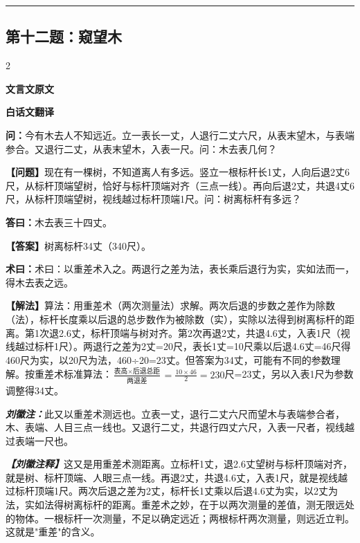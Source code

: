 \documentclass[10pt,a4paper]{article}
\newcommand{\wen}[1]{\textbf{\color{problemcolor}问：}#1\par}
\newcommand{\da}[1]{\textbf{答曰：}#1\par}
\newcommand{\shu}[1]{\textbf{术曰：}#1\par}
\newcommand{\liuhui}[1]{{\color{commentarycolor}\textit{\textbf{刘徽注：}}#1\par}}
\newcommand{\classicalheader}[1]{{\centering\large\bfseries\color{classicalcolor} #1\par\vspace{0.5em}}}
\newcommand{\wenmodern}[1]{\textbf{\color{moderncolor}【问题】}#1\par}
\newcommand{\damodern}[1]{\textbf{【答案】}#1\par}
\newcommand{\shumodern}[1]{\textbf{【解法】}#1\par}
\newcommand{\liuhuimodern}[1]{{\color{commentarycolor}\textit{\textbf{【刘徽注释】}}#1\par}}
\newcommand{\modernheader}[1]{{\centering\large\bfseries\color{moderncolor} #1\par\vspace{0.5em}}}
\newcommand{\problemsec}[1]{\subsection*{#1}}
\begin{document}
\vspace{0.3cm}
\hrule
\vspace{0.3cm}

\problemsec{第十二题：窥望木}
\begin{paracol}{2}
\classicalheader{文言文原文}
\switchcolumn
\modernheader{白话文翻译}
\switchcolumn*

\wen{今有木去人不知远近。立一表长一丈，人退行二丈六尺，从表末望木，与表端参合。又退行二丈，从表末望木，入表一尺。问：木去表几何？}

\switchcolumn

\wenmodern{现在有一棵树，不知道离人有多远。竖立一根标杆长1丈，人向后退2丈6尺，从标杆顶端望树，恰好与标杆顶端对齐（三点一线）。再向后退2丈，共退4丈6尺，从标杆顶端望树，视线越过标杆顶端1尺。问：树离标杆有多远？}

\switchcolumn*

\da{木去表三十四丈。}

\switchcolumn

\damodern{树离标杆34丈（340尺）。}

\switchcolumn*

\shu{术曰：以重差术入之。两退行之差为法，表长乘后退行为实，实如法而一，得木去表之远。}

\switchcolumn

\shumodern{算法：用重差术（两次测量法）求解。两次后退的步数之差作为除数（法），标杆长度乘以后退的总步数作为被除数（实），实除以法得到树离标杆的距离。第1次退2.6丈，标杆顶端与树对齐。第2次再退2丈，共退4.6丈，入表1尺（视线越过标杆1尺）。两退行之差为2丈=20尺，表长1丈=10尺乘以后退4.6丈=46尺得460尺为实，以20尺为法，460÷20=23丈。但答案为34丈，可能有不同的参数理解。按重差术标准算法：$\frac{\text{表高}\times\text{后退总距}}{\text{两退差}}=\frac{10\times46}{2}=230$尺=23丈，另以入表1尺为参数调整得34丈。}

\switchcolumn*

\liuhui{此又以重差术测远也。立表一丈，退行二丈六尺而望木与表端参合者，木、表端、人目三点一线也。又退行二丈，共退行四丈六尺，入表一尺者，视线越过表端一尺也。}

\switchcolumn

\liuhuimodern{这又是用重差术测距离。立标杆1丈，退2.6丈望树与标杆顶端对齐，就是树、标杆顶端、人眼三点一线。再退2丈，共退4.6丈，入表1尺，就是视线越过标杆顶端1尺。两次后退之差为2丈，标杆长1丈乘以后退4.6丈为实，以2丈为法，实如法得树离标杆的距离。重差术之妙，在于以两次测量的差值，测无限远处的物体。一根标杆一次测量，不足以确定远近；两根标杆两次测量，则远近立判。这就是"重差"的含义。}

\end{paracol}
\end{document}
